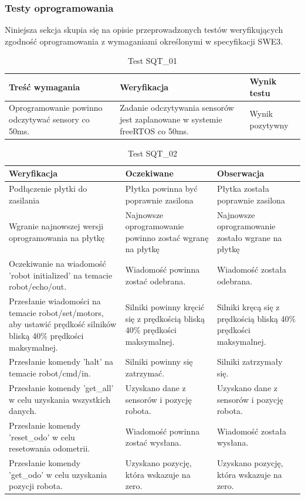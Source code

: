 \documentclass[12pt,twoside]{article}
\begin{document}
\newpage
\subsubsection{Testy oprogramowania}
Niniejsza sekcja skupia się na opisie przeprowadzonych testów weryfikujących zgodność oprogramowania z wymaganiami określonymi w specyfikacji SWE3.

\begin{table}[ht]
\caption{Test SQT\_01}
\centering		
	\begin{tabular}{|p{}|p{}|p{}|}	
		\hline
		Treść wymagania & Weryfikacja & Wynik testu \\
		\hline
		Oprogramowanie powinno odczytywać sensory co 50ms. & Zadanie odczytywania sensorów jest zaplanowane w systemie freeRTOS co 50ms. & Wynik pozytywny \\
		\hline
	\end{tabular}	
	
\label{Tab:TEST1}
\end{table}	

\begin{table}[ht]
\caption{Test SQT\_02}
\centering		
	\begin{tabular}{|p{}|p{}|p{}|}	
		\hline
		Weryfikacja & Oczekiwane & Obserwacja \\
		\hline
		Podłączenie płytki do zasilania &
		Płytka powinna być poprawnie zasilona &
		Płytka została poprawnie zasilona \\
		\hline
		Wgranie najnowszej wersji oprogramowania na płytkę &
		Najnowsze oprogramowanie powinno zostać wgranę na płytkę &
		Najnowsze oprogramowanie zostało wgrane na płytkę \\
		\hline
		Oczekiwanie na wiadomość 'robot initialized' na temacie robot/echo/out. &
		Wiadomość powinna zostać odebrana. &
		Wiadomość została odebrana. \\
		\hline
		Przesłanie wiadomości na temacie robot/set/motors, aby ustawić prędkość silników bliską 40\% prędkości maksymalnej. 			&
		Silniki powinny kręcić się z prędkością bliską 40\% prędkości maksymalnej. &
		Silniki kręcą się z prędkością bliską 40\% prędkości maksymalnej. \\
		\hline
		Przesłanie komendy 'halt' na temacie robot/cmd/in. &
		Silniki powinny się zatrzymać. &
		Silniki zatrzymały się. \\
		\hline
		Przesłanie komendy 'get\_all' w celu uzyskania wszystkich danych. &
		Uzyskano dane z sensorów i pozycję robota. &
		Uzyskano dane z sensorów i pozycję robota. \\
		\hline
		Przesłanie komendy 'reset\_odo' w celu resetowania odometrii. &
		Wiadomość powinna zostać wysłana. &
		Wiadomość została wysłana. \\
		\hline
		Przesłanie komendy 'get\_odo' w celu uzyskania pozycji robota. &
		Uzyskano pozycję, która wskazuje na zero. &
		Uzyskano pozycję, która wskazuje na zero. \\
		\hline
	\end{tabular}	
	
\label{Tab:TEST1}
\end{table}	
\newpage
\end{document}
